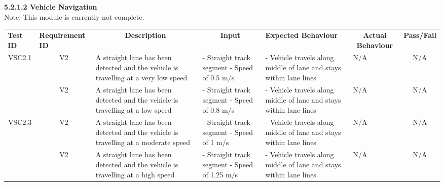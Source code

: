 \documentclass [10pt]{article}
\begin{document}
    
    
    
    
    
    \textbf{5.2.1.2 Vehicle Navigation} \vspace{2mm}\\
    Note: This module is currently not complete. \\
 \begin{longtable}{ | p{ } | p{ } |  p{ } |  p{ } | p{ } | p{ } |  p{ } |}  \hline

    \rowcolor{subsectionC}\textbf{Test ID}  
    & \textbf{Requirement ID}
    & \multicolumn{1}{c|}{\textbf{Description} }
    & \multicolumn{1}{c|}{\textbf{Input} }
    & \textbf{Expected Behaviour} 
    & \multicolumn{1}{c|}{\textbf{Actual Behaviour}}
    & \textbf{Pass/Fail} \\    
    
    \multicolumn{1}{|c|}{VSC2.1} 
    & \multicolumn{1}{c|}{V2}
    & A straight lane has been detected and the vehicle is travelling at a very low speed
    & - Straight track segment \newline - Speed of 0.5 m/s
    & - Vehicle travels along middle of lane and stays within lane lines
    & N/A
    & \multicolumn{1}{c|}{N/A}\\ 
    
    \rowcolor{tableCell}\multicolumn{1}{|c|}{VSC2.2} 
    & \multicolumn{1}{c|}{V2}
    & A straight lane has been detected and the vehicle is travelling at a low speed
    & - Straight track segment \newline - Speed of 0.8 m/s
    & - Vehicle travels along middle of lane and stays within lane lines
    & N/A 
    & \multicolumn{1}{c|}{N/A}\\ 
    
    \multicolumn{1}{|c|}{VSC2.3}
    & \multicolumn{1}{c|}{V2}
    & A straight lane has been detected and the vehicle is travelling at a moderate speed
    & - Straight track segment \newline - Speed of 1 m/s
    & - Vehicle travels along middle of lane and stays within lane lines
    & N/A
    & \multicolumn{1}{c|}{N/A}\\
    
    \rowcolor{tableCell}\multicolumn{1}{|c|}{VSC2.4} 
    & \multicolumn{1}{c|}{V2}
    & A straight lane has been detected and the vehicle is travelling at a high speed
    & - Straight track segment \newline - Speed of 1.25 m/s
    & - Vehicle travels along middle of lane and stays within lane lines
    & N/A 
    & \multicolumn{1}{c|}{N/A}\\ 
    

\end{longtable}
\end{document}
